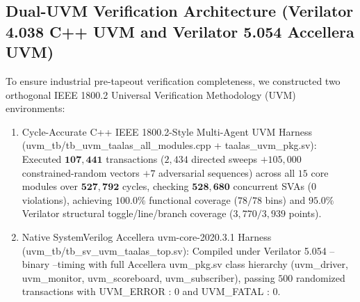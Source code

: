 \documentclass[10pt,journal,compsoc]{IEEEtran}
\def\texttt#1{#1}%
\def\textbf#1{#1}%
\begin{document}
\subsection{Dual-UVM Verification Architecture (\texttt{Verilator 4.038} C++ UVM and \texttt{Verilator 5.054} Accellera UVM)}
To ensure industrial pre-tapeout verification completeness, we constructed two orthogonal IEEE 1800.2 Universal Verification Methodology (UVM) environments:
\begin{enumerate}
    \item \textbf{Cycle-Accurate C++ IEEE 1800.2-Style Multi-Agent UVM Harness (\texttt{uvm\_tb/tb\_uvm\_taalas\_all\_modules.cpp} + \texttt{taalas\_uvm\_pkg.sv})}: Executed $\mathbf{107,441}$ transactions ($2,434$ directed sweeps $+ 105,000$ constrained-random vectors $+ 7$ adversarial sequences) across all $15$ core modules over $\mathbf{527,792}$ cycles, checking $\mathbf{528,680}$ concurrent SVAs ($0$ violations), achieving $\mathbf{100.0\%}$ functional coverage ($78/78$ bins) and $\mathbf{95.0\%}$ Verilator structural toggle/line/branch coverage ($3,770/3,939$ points).
    \item \textbf{Native SystemVerilog Accellera \texttt{uvm-core-2020.3.1} Harness (\texttt{uvm\_tb/tb\_sv\_uvm\_taalas\_top.sv})}: Compiled under \texttt{Verilator 5.054 --binary --timing} with full Accellera \texttt{uvm\_pkg.sv} class hierarchy (\texttt{uvm\_driver}, \texttt{uvm\_monitor}, \texttt{uvm\_scoreboard}, \texttt{uvm\_subscriber}), passing $500$ randomized transactions with \texttt{UVM\_ERROR : 0} and \texttt{UVM\_FATAL : 0}.
\end{enumerate}
\end{document}
